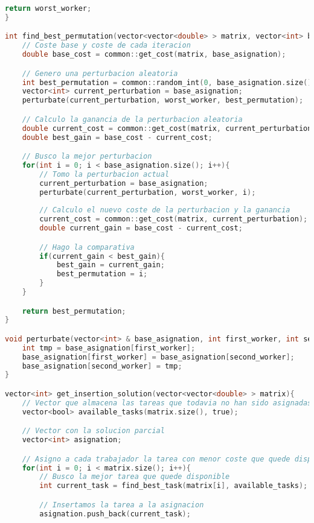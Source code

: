 \documentclass[10pt, a4paper]{article}
\theoremstyle{theorem-style}
\theoremstyle{theorem-style}
\theoremstyle{definition-style}
\theoremstyle{remark-style}
\theoremstyle{example-style}
\theoremstyle{definition-style}
\theoremstyle{remark-style}
\begin{document}
\begin{lstlisting}[language=C]
    return worst_worker;
}

int find_best_permutation(vector<vector<double> > matrix, vector<int> base_asignation, int worst_worker){
    // Coste base y coste de cada iteracion
    double base_cost = common::get_cost(matrix, base_asignation);         

    // Genero una perturbacion aleatoria
    int best_permutation = common::random_int(0, base_asignation.size() -1);
    vector<int> current_perturbation = base_asignation;
    perturbate(current_perturbation, worst_worker, best_permutation);

    // Calculo la ganancia de la perturbacion aleatoria
    double current_cost = common::get_cost(matrix, current_perturbation);
    double best_gain = base_cost - current_cost;

    // Busco la mejor perturbacion
    for(int i = 0; i < base_asignation.size(); i++){
        // Tomo la perturbacion actual
        current_perturbation = base_asignation;
        perturbate(current_perturbation, worst_worker, i);
        
        // Calculo el nuevo coste de la perturbacion y la ganancia
        current_cost = common::get_cost(matrix, current_perturbation);
        double current_gain = base_cost - current_cost;

        // Hago la comparativa
        if(current_gain < best_gain){
            best_gain = current_gain;
            best_permutation = i;
        }
    }

    return best_permutation;
}

void perturbate(vector<int> & base_asignation, int first_worker, int second_worker){
    int tmp = base_asignation[first_worker];
    base_asignation[first_worker] = base_asignation[second_worker];
    base_asignation[second_worker] = tmp;
}

vector<int> get_insertion_solution(vector<vector<double> > matrix){
    // Vector que almacena las tareas que todavia no han sido asignadas
    vector<bool> available_tasks(matrix.size(), true);

    // Vector con la solucion parcial
    vector<int> asignation;

    // Asigno a cada trabajador la tarea con menor coste que quede disponible
    for(int i = 0; i < matrix.size(); i++){
        // Busco la mejor tarea que quede disponible
        int current_task = find_best_task(matrix[i], available_tasks);

        // Insertamos la tarea a la asignacion
        asignation.push_back(current_task);


\end{lstlisting}
\end{document}
